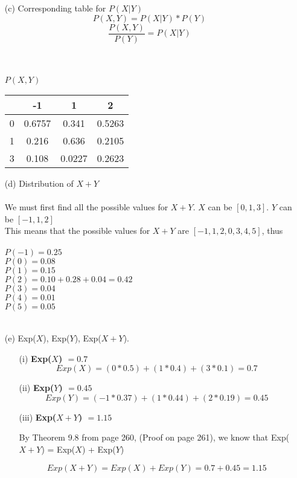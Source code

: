 \documentclass[11pt]{article}
\begin{document}
\begin{enumerate}
\item[(c)] Corresponding table for $P(X|Y)$
\\
$$P(X, Y) = P(X | Y) * P(Y)$$
$$\frac{P(X, Y)}{P(Y)} = P(X | Y)$$
\\ \\
\begin{center}
{\Large \textbf{$P(X, Y)$}}\\ 
  \begin{tabular}{ r || c | c | c |}
	 & -1 & 1 & 2 \\ \hline
	 0 & 0.6757 & 0.341 & 0.5263\\ \hline   
    1 & 0.216 & 0.636 & 0.2105 \\ \hline
    3 & 0.108 & 0.0227 & 0.2623 \\ \hline
    \hline
  \end{tabular}
\end{center}
\item[(d)] Distribution of $X + Y$
\\ \\
We must first find all the possible values for $X + Y$.  $X$ can be $[0, 1, 3]$.  $Y$ can be $[-1, 1, 2]$\\
This means that the possible values for $X + Y$ are $[-1, 1, 2, 0, 3, 4, 5]$, thus
\\\\
$P(-1) = 0.25$\\
$P(0) = 0.08$\\
$P(1) = 0.15$ \\
$P(2) = 0.10 + 0.28 + 0.04 = 0.42$\\
$P(3) = 0.04$\\
$P(4) = 0.01$\\
$P(5) = 0.05$\\\
\item[(e)] Exp($X$), Exp($Y$), Exp($X + Y$).
\begin{enumerate}
\item[(i)] \textbf{Exp($X$) $= 0.7$}
\\
$$Exp(X) = (0 * 0.5) + (1 * 0.4) + (3 * 0.1) = 0.7$$
\item[(ii)] \textbf{Exp($Y$) $= 0.45$}
\\
$$Exp(Y) = (-1 * 0.37) + (1 * 0.44) + (2 * 0.19) = 0.45$$
\item[(iii)] \textbf{Exp($X + Y$) $= 1.15$}
\\
\begin{center}
By Theorem 9.8 from page 260, (Proof on page 261), we know that Exp($X + Y$) = Exp($X$) + Exp($Y$)
\end{center}
\vspace{5mm}
$$Exp(X + Y) = Exp(X) + Exp(Y) = 0.7 + 0.45 = 1.15$$
\end{enumerate}
\end{enumerate}
\end{document}
